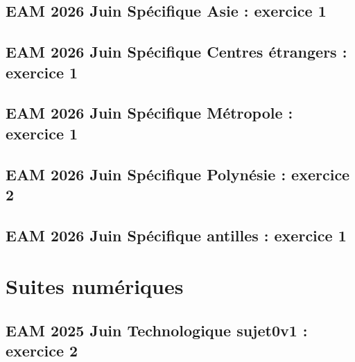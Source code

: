 \documentclass[lang=fr,edition=teacher,layout=sheet]{mxbook}
\begin{document}
\begingroup\endgroup
\par\bigskip
{}\subsection*{EAM 2026 Juin Spécifique Asie : exercice 1}
\begingroup\endgroup
\par\bigskip
{}\subsection*{EAM 2026 Juin Spécifique Centres étrangers : exercice 1}
\begingroup\endgroup
\par\bigskip
{}\subsection*{EAM 2026 Juin Spécifique Métropole : exercice 1}
\begingroup\endgroup
\par\bigskip
{}\subsection*{EAM 2026 Juin Spécifique Polynésie : exercice 2}
\begingroup\endgroup
\par\bigskip
{}\subsection*{EAM 2026 Juin Spécifique antilles : exercice 1}
\begingroup\endgroup
\par\bigskip
\clearpage\section*{Suites numériques}
\subsection*{EAM 2025 Juin Technologique sujet0v1 : exercice 2}
\end{document}
